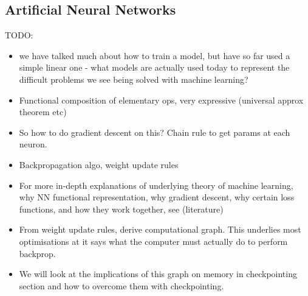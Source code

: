 \subsection{Artificial Neural Networks}
TODO:
\begin{itemize}
    \item we have talked much about how to train a model, but have so far used a simple linear one - what models are actually used today to represent the difficult problems we see being solved with machine learning?
    \item Functional composition of elementary ops, very expressive (universal approx theorem etc)
    \item So how to do gradient descent on this? Chain rule to get params at each neuron.
    \item Backpropagation algo, weight update rules
    \item For more in-depth explanations of underlying theory of machine learning, why NN functional representation, why gradient descent, why certain loss functions, and how they work together, see (literature)
    \item From weight update rules, derive computational graph. This underlies most optimisations at it says what the computer must actually do to perform backprop.
     \item We will look at the implications of this graph on memory in checkpointing section and how to overcome them with checkpointing.
\end{itemize}
